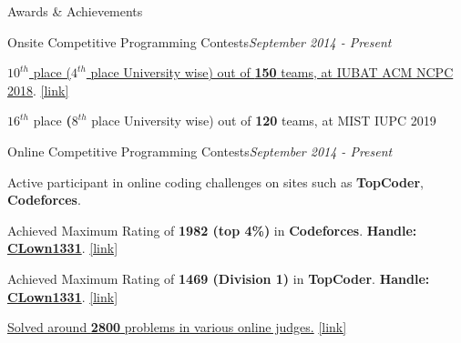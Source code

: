 \documentclass{resume}
\begin{document}
\begin{rSection}{Awards \& Achievements} 

\begin{rSubsection}{Onsite Competitive Programming Contests}{\em September 2014 - Present}{}{}{}
\item \href{https://icpc.baylor.edu/ICPCID/DII3NHEO8O8I}{\textbf{$10^{th}$} place (\textbf{$4^{th}$} place University wise) out of \textbf{150} teams, at IUBAT ACM NCPC 2018}. \href{https://icpc.baylor.edu/ICPCID/DII3NHEO8O8I}{[link]}
\item \textbf{$16^{th}$} place \textbf(\textbf{$8^{th}$} place University wise) out of \textbf{120} teams, at MIST IUPC 2019
\end{rSubsection}

\begin{rSubsection}{Online Competitive Programming Contests}{\em September 2014 - Present}{}{}{}
\item Active participant in online coding challenges on sites such as \textbf{TopCoder}, \textbf{Codeforces}.
\item Achieved Maximum Rating of \textbf{1982 (top 4\%)} in \textbf{Codeforces}. \textbf{Handle:} \textbf{\href{http://codeforces.com/profile/CLown1331}{CLown1331}}. \href{http://codeforces.com/profile/CLown1331}{[link]}
\item Achieved Maximum Rating of \textbf{1469 (Division 1)} in \textbf{TopCoder}. \textbf{Handle:} \textbf{\href{https://www.topcoder.com/members/CLown1331/}{CLown1331}}. \href{https://www.topcoder.com/members/CLown1331/}{[link]}
\item \href{https://www.stopstalk.com/user/profile/clown1331}{Solved around \textbf{2800} problems in various online judges.} \href{https://www.stopstalk.com/user/profile/clown1331}{[link]}
\end{rSubsection}

\end{rSection}
\end{document}
